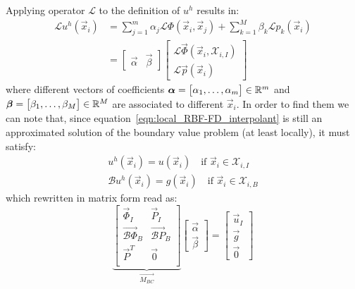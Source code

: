 Applying operator $\mathcal{L}$ to the definition of $u^h$ results in:
\begin{equation}
	\label{eqn:L_of_local_RBF-FD_interpolant}
	\begin{aligned}
		\mathcal{L} u^h(\vec{x}_i) & = \sum_{j=1}^{m} \alpha_j \mathcal{L} \Phi(\vec{x}_i, \vec{x}_j) + \sum_{k=1}^{M} \beta_k \mathcal{L} p_k(\vec{x}_i)  \\
								   & = \begin{bmatrix}
								   			\vec{\alpha} & \vec{\beta}
								   	   \end{bmatrix}
							   	   	   \begin{bmatrix}
							   	   	   		\mathcal{L} \vec{\Phi}(\vec{x}_i, \mathcal{X}_{i,I})  \\
							   	   	   		\mathcal{L} \vec{p}(\vec{x}_i)
							   	   	   \end{bmatrix}	
	\end{aligned}
\end{equation}
where different vectors of coefficients $\boldsymbol{\alpha} = \bigl[\alpha_1, \dots, \alpha_m \bigr] \in \mathbb{R}^m$ and $\boldsymbol{\beta} = \bigl[ \beta_1, \dots, \beta_M \bigr] \in \mathbb{R}^M$ are associated to different $\vec{x}_i$.
In order to find them we can note that, since equation~\eqref{eqn:local_RBF-FD_interpolant} is still an approximated solution of the boundary value problem (at least locally), it must satisfy:
\begin{equation}
	\begin{gathered}
		\label{eqn:u^h_approx_u_conditions}
		u^h(\vec{x}_i) = u(\vec{x}_i) \quad \text{if $\vec{x}_i \in \mathcal{X}_{i,I}$}  \\
		\mathcal{B} u^h(\vec{x}_i) = g(\vec{x}_i) \quad \text{if $\vec{x}_i \in \mathcal{X}_{i,B}$}
	\end{gathered}
\end{equation}
which rewritten in matrix form read as:
\begin{equation}
\underbrace{
\begin{bmatrix}
	\vec{\Phi}_I  			 &  \vec{P}_I  			  \\
	\vec{\mathcal{B}\Phi}_B  &  \vec{\mathcal{B}P}_B  \\
	\vec{P}^T				 &  \vec{0}				  \\
\end{bmatrix}}_{\vec{M_{BC}}}
\begin{bmatrix}
	\vec{\alpha}  \\
	\vec{\beta}
\end{bmatrix}
=
\begin{bmatrix}
	\vec{u}_I  \\
	\vec{g}	   \\
	\vec{0}
\end{bmatrix}
\end{equation}

